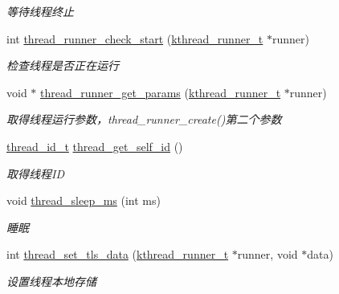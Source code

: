 \begin{DoxyCompactItemize}
\begin{DoxyCompactList}\small\item\em 等待线程终止 \end{DoxyCompactList}\item 
int \hyperlink{a00121_ga3a56e5d1203f6697a6579202919aa048_ga3a56e5d1203f6697a6579202919aa048}{thread\+\_\+runner\+\_\+check\+\_\+start} (\hyperlink{a00056_a4f78c259c9527c821f1a6f87495dd339_a4f78c259c9527c821f1a6f87495dd339}{kthread\+\_\+runner\+\_\+t} $\ast$runner)
\begin{DoxyCompactList}\small\item\em 检查线程是否正在运行 \end{DoxyCompactList}\item 
void $\ast$ \hyperlink{a00121_ga2126b5da850ec506d0909eb81f9a50dc_ga2126b5da850ec506d0909eb81f9a50dc}{thread\+\_\+runner\+\_\+get\+\_\+params} (\hyperlink{a00056_a4f78c259c9527c821f1a6f87495dd339_a4f78c259c9527c821f1a6f87495dd339}{kthread\+\_\+runner\+\_\+t} $\ast$runner)
\begin{DoxyCompactList}\small\item\em 取得线程运行参数，thread\+\_\+runner\+\_\+create()第二个参数 \end{DoxyCompactList}\item 
\hyperlink{a00056_ad0ada5642d10ce71bdd90816182f9b79_ad0ada5642d10ce71bdd90816182f9b79}{thread\+\_\+id\+\_\+t} \hyperlink{a00121_gaecf10907eee00ec0e807271c906a6645_gaecf10907eee00ec0e807271c906a6645}{thread\+\_\+get\+\_\+self\+\_\+id} ()
\begin{DoxyCompactList}\small\item\em 取得线程\+I\+D \end{DoxyCompactList}\item 
void \hyperlink{a00121_gabddf3ac30aac3f22f8c53b7517e6eb35_gabddf3ac30aac3f22f8c53b7517e6eb35}{thread\+\_\+sleep\+\_\+ms} (int ms)
\begin{DoxyCompactList}\small\item\em 睡眠 \end{DoxyCompactList}\item 
int \hyperlink{a00121_ga76839139180a3f0d0b017a5f39801936_ga76839139180a3f0d0b017a5f39801936}{thread\+\_\+set\+\_\+tls\+\_\+data} (\hyperlink{a00056_a4f78c259c9527c821f1a6f87495dd339_a4f78c259c9527c821f1a6f87495dd339}{kthread\+\_\+runner\+\_\+t} $\ast$runner, void $\ast$data)
\begin{DoxyCompactList}\small\item\em 设置线程本地存储 \end{DoxyCompactList}\item 

\end{DoxyCompactItemize}
